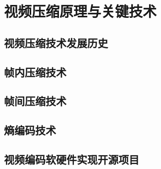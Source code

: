 \chapter{视频压缩原理与关键技术}
\label{cha:c2}

\section{视频压缩技术发展历史}

\section{帧内压缩技术}

\section{帧间压缩技术}

\section{熵编码技术}

\section{视频编码软硬件实现开源项目}